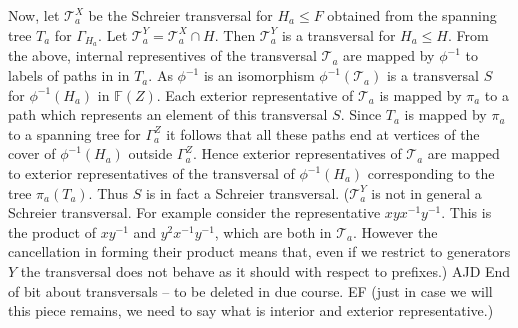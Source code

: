 \documentclass[a4paper,12pt]{article}
\newcommand{\G}{\Gamma }
\numberwithin{equation}{section}
\numberwithin{figure}{section}
\newcommand{\FF}{\ensuremath{\mathbb{F}}}
\newcommand{\cT}{\mathcal{T}}
\newenvironment{ajd1}{\noindent\color{red} AJD }{}
\newcommand{\ajd}[1]{\begin{ajd1} #1 \end{ajd1}}
\newenvironment{bl}{\noindent\color{blue} EF }{}
\newcommand{\li}[1]{\begin{bl} #1 \end{bl}}
\begin{document}
Now, let $\cT_a^X$ be the Schreier transversal for $H_a\le F$ obtained from
the spanning tree $T_a$ for $\G_{H_a}$. Let $\cT_a^Y=\cT_a^X\cap H$. Then $\cT_a^Y$ is
 a transversal for $H_a\le H$. From the above,  
 internal representives of the  transversal $\cT_a$ are mapped 
by $\phi^{-1}$ to labels of paths in  
in $T_a$. As $\phi^{-1}$ is an isomorphism $\phi^{-1}(\cT_a)$ is 
a transversal $S$ for  $\phi^{-1}(H_a)$ in $\FF(Z)$. Each exterior representative
of $\cT_a$ is mapped by $\pi_a$ to a path which represents an element
of this transversal $S$. Since $T_a$ is mapped by $\pi_a$ to a spanning
tree for $\G_a^Z$ it follows that all these paths end at vertices of the
cover of $\phi^{-1}(H_a)$ outside $\G_a^Z$. Hence exterior representatives
of $\cT_a$ are mapped to exterior representatives of the transversal
of $\phi^{-1}(H_a)$ corresponding to the tree $\pi_a(T_a)$. Thus $S$
is in fact a Schreier transversal.
 ($\cT_a^Y$ is not in general a Schreier transversal. For example
consider the representative $xyx^{-1}y^{-1}$. This is the product
of $xy^{-1}$ and $y^2x^{-1}y^{-1}$, which are both in $\cT_a$. However
the cancellation in forming their product means that, even if we 
restrict to generators $Y$ the transversal does not behave as it 
should with respect to prefixes.)
\ajd{End of bit about transversals -- to be deleted in due course.}
\li{(just in case we will this piece remains, we need to say what is interior and exterior representative.) }
 
\end{document}
